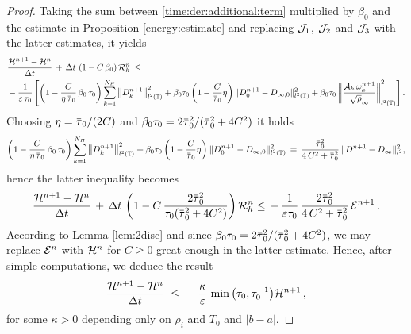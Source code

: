 \documentclass[11pt]{amsart}
\numberwithin{equation}{section}
\numberwithin{figure}{section}
\begin{document}
\begin{proof}
%	
Taking the sum between \eqref{time:der:additional:term} multiplied by $\beta_0$ and the estimate in Proposition \ref{energy:estimate} and replacing ${\mathcal J}_1$, ${\mathcal J}_2$ and ${\mathcal J}_3$ with the latter estimates, it yields
	\begin{align*}
		&\frac{\cH^{n+1}
			-\cH^{n}}{\Delta t}
		\,+\,
		\Delta t\,\left(1-C\,\beta_0\right)\cR_h^{n}\,\leq \\
		&-\frac{1}{\eps\,\tau_0}
		\left[
		\left(1-\frac{C}{\eta\,\ols{\tau}_0}\,\beta_0\,\tau_0\right)\sum_{k=1}^{N_H} \left\|D^{n+1}_k\right\|^2_{l^2\left(\T\right)}
		+
		\beta_0\tau_0\left(1-
		\frac{C}{\ols{\tau}_0}\eta\right) \| D^{n+1}_0-D_{\infty,0}
		\|_{l^2\left(\T\right)}^2
		+\beta_0\tau_0\left\|
		\frac{\cA_h\,\omega^{n+1}_h}{\sqrt{\rho}_{\infty}}
		\right\|^2_{l^2\left(\T\right)}
		\right].
	\end{align*}
	Choosing $\eta=\ols{\tau}_0/(2C)$ and
	$\beta_0\tau_0=2\ols{\tau}_0^2/(\ols{\tau}_0^2+4 C^2)$ it holds
	$$
	\left(1-\frac{C}{\eta\,\ols{\tau}_0}\,\beta_0\,\tau_0\right)\sum_{k=1}^{N_H} \left\|D^{n+1}_k\right\|^2_{l^2\left(\T\right)}
	+
	\beta_0\tau_0\left(1-
	\frac{C}{\ols{\tau}_0}\eta\right) \| D^{n+1}_0-D_{\infty,0}
	\|_{l^2\left(\T\right)}^2 \,=\, \frac{\ols{\tau}_0^2}{4\,C^2+\ols{\tau}_0^2}\, \| D^{n+1}-D_{\infty}\|_{l^2}^2, 
	$$
	hence the latter inequality becomes
	\[
	\frac{\cH^{n+1}
		-\cH^{n}}{\Delta t}
	\,+\,
	\Delta t\,\left(1-C\,\frac{2\ols{\tau}_0^2}{\tau_0(\ols{\tau}_0^2+4C^2)}\right)\cR_h^{n}\,\\
	\leq
	\,-\,\frac{1}{\eps\tau_0}\,
	\frac{2\ols{\tau}_0^2}{4\,C^2+\ols{\tau}_0^2}\,\cE^{n+1}
	\,.
	\]
	According to Lemma \ref{lem:2disc} and since $\beta_0\tau_0=2\ols{\tau}_0^2/(\ols{\tau}_0^2+4 C^2)$, we may replace ${\mathcal E}^n$ with ${\mathcal H}^n$ for $C\geq 0$ great enough in the latter estimate. Hence, after simple computations, we deduce the result
	\[
	\frac{{\mathcal H}^{n+1}
		-{\mathcal H}^{n}}{\Delta t}\;
	\leq\;
	\,-\,\frac{\kappa}{\varepsilon}\,\min{\left(\tau_0,\tau_0^{-1}\right)}{\mathcal H}^{n+1}
	\,,
	\]
	for some $\kappa>0$ depending only on $\rho_i$ and $T_0$ and $|b-a|$.
\end{proof}
\end{document}
